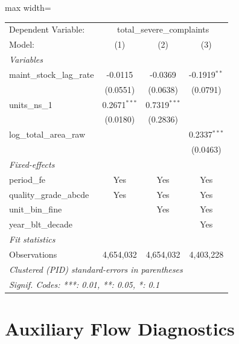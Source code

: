 \documentclass[
  11pt,
]{article}
\begin{document}
\begin{adjustbox}{max width=\textwidth}

\begingroup
\centering
\begin{tabular}{lccc}
   \tabularnewline \midrule \midrule
   Dependent Variable: & \multicolumn{3}{c}{total\_severe\_complaints}\\
   Model:                     & (1)            & (2)            & (3)\\  
   \midrule
   \emph{Variables}\\
   maint\_stock\_lag\_rate    & -0.0115        & -0.0369        & -0.1919$^{**}$\\   
                              & (0.0551)       & (0.0638)       & (0.0791)\\   
   units\_ns\_1               & 0.2671$^{***}$ & 0.7319$^{***}$ &   \\   
                              & (0.0180)       & (0.2836)       &   \\   
   log\_total\_area\_raw      &                &                & 0.2337$^{***}$\\   
                              &                &                & (0.0463)\\   
   \midrule
   \emph{Fixed-effects}\\
   period\_fe                 & Yes            & Yes            & Yes\\  
   quality\_grade\_abcde      & Yes            & Yes            & Yes\\  
   unit\_bin\_fine            &                & Yes            & Yes\\  
   year\_blt\_decade          &                &                & Yes\\  
   \midrule
   \emph{Fit statistics}\\
   Observations               & 4,654,032      & 4,654,032      & 4,403,228\\  
   \midrule \midrule
   \multicolumn{4}{l}{\emph{Clustered (PID) standard-errors in parentheses}}\\
   \multicolumn{4}{l}{\emph{Signif. Codes: ***: 0.01, **: 0.05, *: 0.1}}\\
\end{tabular}
\par\endgroup



\end{adjustbox}

\section{Auxiliary Flow Diagnostics}\label{auxiliary-flow-diagnostics}
\end{document}
